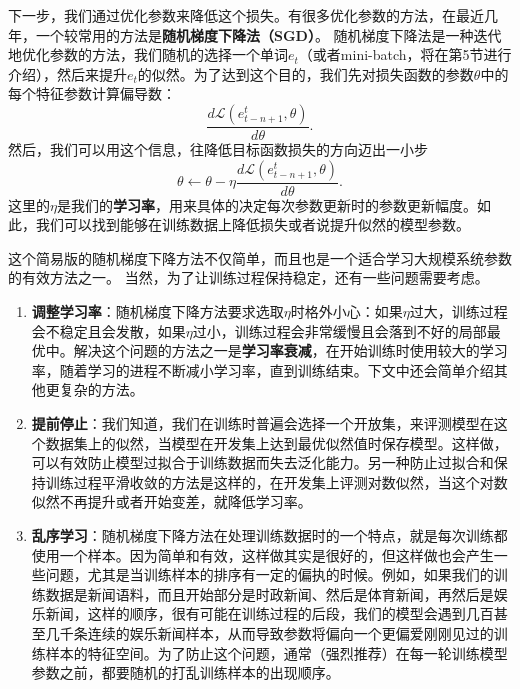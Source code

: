\documentclass[10pt,a4paper]{ctexart}
\begin{document}
下一步，我们通过优化参数来降低这个损失。有很多优化参数的方法，在最近几年，一个较常用的方法是\textbf{随机梯度下降法（SGD）}。
随机梯度下降法是一种迭代地优化参数的方法，我们随机的选择一个单词$e_t$（或者mini-batch，将在第5节进行介绍），然后来提升$e_t$的似然。为了达到这个目的，我们先对损失函数的参数$\theta$中的每个特征参数计算偏导数：
\[
 \frac{d\mathcal{L}(e_{t-n+1}^{t},\theta)}{d\theta}.
\]
然后，我们可以用这个信息，往降低目标函数损失的方向迈出一小步
\[
 \theta \leftarrow \theta - \eta \frac{d\mathcal{L}(e_{t-n+1}^{t},\theta)}{d\theta}.
\]
这里的$\eta$是我们的\textbf{学习率}，用来具体的决定每次参数更新时的参数更新幅度。如此，我们可以找到能够在训练数据上降低损失或者说提升似然的模型参数。

这个简易版的随机梯度下降方法不仅简单，而且也是一个适合学习大规模系统参数的有效方法之一。
当然，为了让训练过程保持稳定，还有一些问题需要考虑。
\begin{enumerate}
\item[] \textbf{调整学习率}：随机梯度下降方法要求选取$\eta$时格外小心：如果$\eta$过大，训练过程会不稳定且会发散，如果$\eta$过小，训练过程会非常缓慢且会落到不好的局部最优中。解决这个问题的方法之一是\textbf{学习率衰减}，在开始训练时使用较大的学习率，随着学习的进程不断减小学习率，直到训练结束。下文中还会简单介绍其他更复杂的方法。
\item[] \textbf{提前停止}：我们知道，我们在训练时普遍会选择一个开放集，来评测模型在这个数据集上的似然，当模型在开发集上达到最优似然值时保存模型。这样做，可以有效防止模型过拟合于训练数据而失去泛化能力。另一种防止过拟合和保持训练过程平滑收敛的方法是这样的，在开发集上评测对数似然，当这个对数似然不再提升或者开始变差，就降低学习率。
\item[] \textbf{乱序学习}：随机梯度下降方法在处理训练数据时的一个特点，就是每次训练都使用一个样本。因为简单和有效，这样做其实是很好的，但这样做也会产生一些问题，尤其是当训练样本的排序有一定的偏执的时候。例如，如果我们的训练数据是新闻语料，而且开始部分是时政新闻、然后是体育新闻，再然后是娱乐新闻，这样的顺序，很有可能在训练过程的后段，我们的模型会遇到几百甚至几千条连续的娱乐新闻样本，从而导致参数将偏向一个更偏爱刚刚见过的训练样本的特征空间。为了防止这个问题，通常（强烈推荐）在每一轮训练模型参数之前，都要随机的打乱训练样本的出现顺序。
\end{enumerate}
\end{document}

